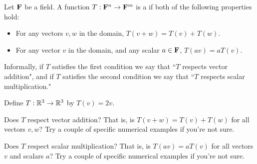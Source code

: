 \endedxvertical








\endedxvertical











{} 
Let ${\bf {F}}$ be a field.  A function $T: {\bf {F}}^n \rightarrow {\bf {F}}^m$ is a {}
if both of the following properties hold:

\begin{itemize}
\item For any vectors $v, w$ in the domain, $T(v + w) = T(v) + T(w).$ 
\item For any vector $v$ in the domain, and any scalar $a\in {\bf {F}}$, $T(av) = aT(v)$.    
\end{itemize}

Informally, if $T$ satisfies the first condition we say that ``$T$ respects vector addition", and 
if $T$ satisfies the second condition we say that ``$T$ respects scalar multiplication."  

\endedxtext

\endedxvertical






Define $T: \mathbb R^3 \rightarrow \mathbb R^3$ by $T(v) = 2v$.  

Does $T$ respect vector addition?  That is, is $T(v + w) = T(v) + T(w)$ for all 
vectors $v,w$?
Try a couple of specific numerical examples if you're not sure.  


Does $T$ respect scalar multiplication?  
That is, is $T(av) = aT(v)$ for all vectors $v$ and scalars $a$?
Try a couple of specific numerical examples if you're not sure.  



